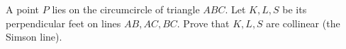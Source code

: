 A point $P$ lies on the circumcircle of triangle $ABC$. Let $K,L,S$ be its perpendicular feet on lines $AB,AC,BC$. Prove that $K,L,S$ are collinear (the Simson line).
